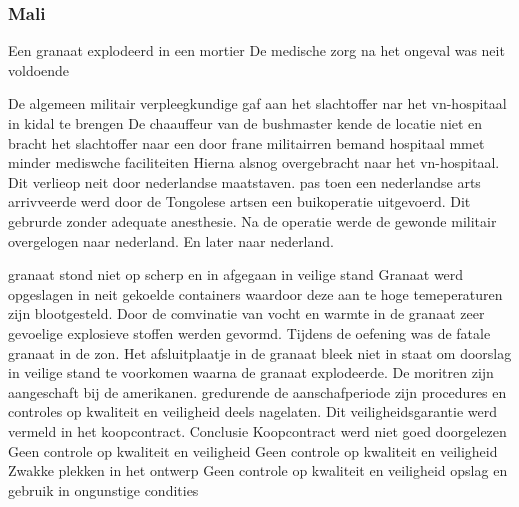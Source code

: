 


















\subsubsection{Mali}
Een granaat explodeerd in een mortier
De medische zorg na het ongeval was neit voldoende


De algemeen militair verpleegkundige gaf aan het slachtoffer nar het vn-hospitaal in kidal te brengen
De chaauffeur van de bushmaster kende de locatie niet  en bracht het slachtoffer naar een door frane militairren bemand hospitaal mmet minder mediswche faciliteiten
Hierna alsnog overgebracht naar het vn-hospitaal.
Dit verlieop  neit door nederlandse maatstaven.
pas toen een nederlandse arts arrivveerde werd door de Tongolese artsen een buikoperatie uitgevoerd.
Dit gebrurde zonder adequate anesthesie.
Na de operatie werde de gewonde militair overgelogen naar nederland. En later naar nederland.


granaat stond niet op scherp en in afgegaan in veilige stand
Granaat werd opgeslagen in neit gekoelde containers waardoor deze aan te hoge temeperaturen zijn blootgesteld.
Door de comvinatie van vocht en warmte in de granaat zeer gevoelige explosieve stoffen werden gevormd.
Tijdens de oefening was de fatale granaat in de zon.
Het afsluitplaatje in de granaat bleek niet in staat om doorslag in veilige stand te voorkomen waarna de granaat explodeerde.
De moritren zijn aangeschaft bij de amerikanen. gredurende de aanschafperiode zijn procedures en controles op kwaliteit en veiligheid deels nagelaten.
Dit veiligheidsgarantie werd vermeld in het koopcontract.
Conclusie
Koopcontract werd niet goed doorgelezen
Geen controle op kwaliteit en veiligheid
Geen controle op kwaliteit en veiligheid
Zwakke plekken in het ontwerp
Geen controle op kwaliteit en veiligheid
opslag en gebruik in ongunstige condities

